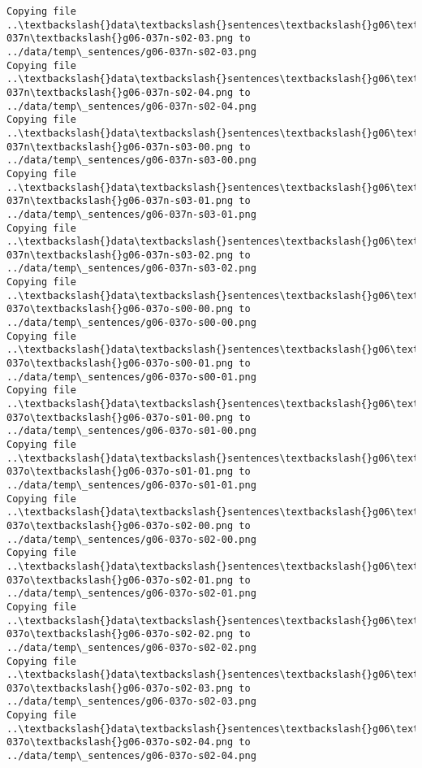 \documentclass[11pt]{article}
\begin{document}
\begin{Verbatim}[commandchars=\\\{\}]
Copying file ..\textbackslash{}data\textbackslash{}sentences\textbackslash{}g06\textbackslash{}g06-037n\textbackslash{}g06-037n-s02-03.png to
../data/temp\_sentences/g06-037n-s02-03.png
Copying file ..\textbackslash{}data\textbackslash{}sentences\textbackslash{}g06\textbackslash{}g06-037n\textbackslash{}g06-037n-s02-04.png to
../data/temp\_sentences/g06-037n-s02-04.png
Copying file ..\textbackslash{}data\textbackslash{}sentences\textbackslash{}g06\textbackslash{}g06-037n\textbackslash{}g06-037n-s03-00.png to
../data/temp\_sentences/g06-037n-s03-00.png
Copying file ..\textbackslash{}data\textbackslash{}sentences\textbackslash{}g06\textbackslash{}g06-037n\textbackslash{}g06-037n-s03-01.png to
../data/temp\_sentences/g06-037n-s03-01.png
Copying file ..\textbackslash{}data\textbackslash{}sentences\textbackslash{}g06\textbackslash{}g06-037n\textbackslash{}g06-037n-s03-02.png to
../data/temp\_sentences/g06-037n-s03-02.png
Copying file ..\textbackslash{}data\textbackslash{}sentences\textbackslash{}g06\textbackslash{}g06-037o\textbackslash{}g06-037o-s00-00.png to
../data/temp\_sentences/g06-037o-s00-00.png
Copying file ..\textbackslash{}data\textbackslash{}sentences\textbackslash{}g06\textbackslash{}g06-037o\textbackslash{}g06-037o-s00-01.png to
../data/temp\_sentences/g06-037o-s00-01.png
Copying file ..\textbackslash{}data\textbackslash{}sentences\textbackslash{}g06\textbackslash{}g06-037o\textbackslash{}g06-037o-s01-00.png to
../data/temp\_sentences/g06-037o-s01-00.png
Copying file ..\textbackslash{}data\textbackslash{}sentences\textbackslash{}g06\textbackslash{}g06-037o\textbackslash{}g06-037o-s01-01.png to
../data/temp\_sentences/g06-037o-s01-01.png
Copying file ..\textbackslash{}data\textbackslash{}sentences\textbackslash{}g06\textbackslash{}g06-037o\textbackslash{}g06-037o-s02-00.png to
../data/temp\_sentences/g06-037o-s02-00.png
Copying file ..\textbackslash{}data\textbackslash{}sentences\textbackslash{}g06\textbackslash{}g06-037o\textbackslash{}g06-037o-s02-01.png to
../data/temp\_sentences/g06-037o-s02-01.png
Copying file ..\textbackslash{}data\textbackslash{}sentences\textbackslash{}g06\textbackslash{}g06-037o\textbackslash{}g06-037o-s02-02.png to
../data/temp\_sentences/g06-037o-s02-02.png
Copying file ..\textbackslash{}data\textbackslash{}sentences\textbackslash{}g06\textbackslash{}g06-037o\textbackslash{}g06-037o-s02-03.png to
../data/temp\_sentences/g06-037o-s02-03.png
Copying file ..\textbackslash{}data\textbackslash{}sentences\textbackslash{}g06\textbackslash{}g06-037o\textbackslash{}g06-037o-s02-04.png to
../data/temp\_sentences/g06-037o-s02-04.png

\end{Verbatim}
\end{document}
